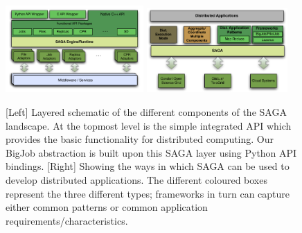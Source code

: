 \documentclass{rspublic}
\begin{document}
\begin{figure}[!ht]
 \begin{center}
     \includegraphics[width=0.47\textwidth]{stci_saga_figures-1.pdf}
    \includegraphics[width=0.48\textwidth]{distributed_applications_saga_figure.pdf}
\end{center}
\caption{\small [Left] Layered schematic of the different components
  of the SAGA landscape. At the topmost level is the simple integrated
  API which provides the basic functionality for distributed
  computing. Our BigJob abstraction is built upon this SAGA layer
  using Python API bindings. [Right] Showing the ways in which SAGA
  can be used to develop distributed applications. The different
  coloured boxes represent the three different types; frameworks in turn
  can capture either common patterns or common application
  requirements/characteristics.} \label{Fig:SAGA1}
\end{figure}
\end{document}
